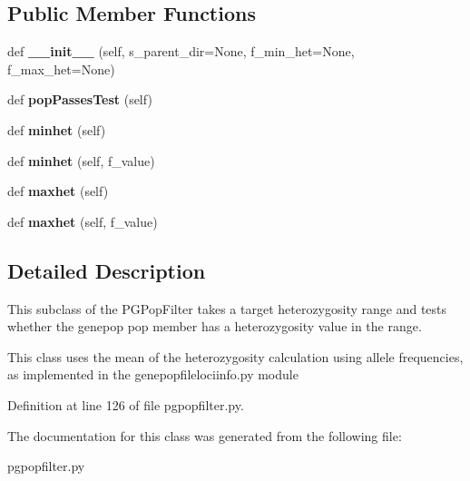 \subsection*{Public Member Functions}
\begin{DoxyCompactItemize}
\item 
def {\bfseries \+\_\+\+\_\+init\+\_\+\+\_\+} (self, s\+\_\+parent\+\_\+dir=None, f\+\_\+min\+\_\+het=None, f\+\_\+max\+\_\+het=None)\hypertarget{classnegui_1_1pgpopfilter_1_1PGPopFilterHet_aa6149daa73ed56fe4b0acb6dd64a2afd}{}\label{classnegui_1_1pgpopfilter_1_1PGPopFilterHet_aa6149daa73ed56fe4b0acb6dd64a2afd}

\item 
def {\bfseries pop\+Passes\+Test} (self)\hypertarget{classnegui_1_1pgpopfilter_1_1PGPopFilterHet_ae5910cec34bf5bc4cf5be4bb2f8d223f}{}\label{classnegui_1_1pgpopfilter_1_1PGPopFilterHet_ae5910cec34bf5bc4cf5be4bb2f8d223f}

\item 
def {\bfseries minhet} (self)\hypertarget{classnegui_1_1pgpopfilter_1_1PGPopFilterHet_af762f8017d97b334fd02f7ef328c8e40}{}\label{classnegui_1_1pgpopfilter_1_1PGPopFilterHet_af762f8017d97b334fd02f7ef328c8e40}

\item 
def {\bfseries minhet} (self, f\+\_\+value)\hypertarget{classnegui_1_1pgpopfilter_1_1PGPopFilterHet_adec807a8c44a94b71c7a97ef983089ea}{}\label{classnegui_1_1pgpopfilter_1_1PGPopFilterHet_adec807a8c44a94b71c7a97ef983089ea}

\item 
def {\bfseries maxhet} (self)\hypertarget{classnegui_1_1pgpopfilter_1_1PGPopFilterHet_aea622372986d0306ad56b2624907d4cd}{}\label{classnegui_1_1pgpopfilter_1_1PGPopFilterHet_aea622372986d0306ad56b2624907d4cd}

\item 
def {\bfseries maxhet} (self, f\+\_\+value)\hypertarget{classnegui_1_1pgpopfilter_1_1PGPopFilterHet_a7ccf060814a054a1d5e6f8874ee8d28f}{}\label{classnegui_1_1pgpopfilter_1_1PGPopFilterHet_a7ccf060814a054a1d5e6f8874ee8d28f}

\end{DoxyCompactItemize}


\subsection{Detailed Description}
\begin{DoxyVerb}This subclass of the PGPopFilter 
takes a target heterozygosity range and tests
whether the genepop pop member has
a heterozygosity value in the range.

This class uses the mean of the heterozygosity calculation
using allele frequencies, as implemented in the
genepopfilelociinfo.py module
\end{DoxyVerb}
 

Definition at line 126 of file pgpopfilter.\+py.



The documentation for this class was generated from the following file\+:\begin{DoxyCompactItemize}
\item 
pgpopfilter.\+py\end{DoxyCompactItemize}
